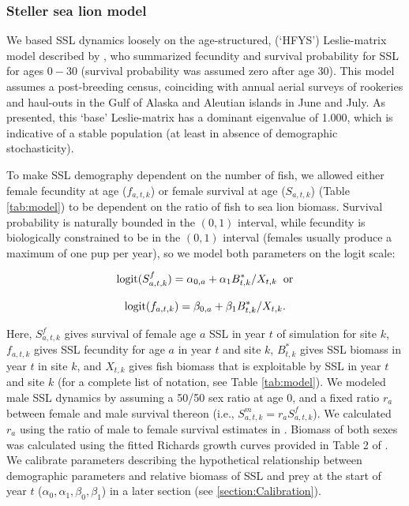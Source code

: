 \documentclass[nonumbib,leqno]{nrc1}
\begin{document}
\subsubsection{Steller sea lion model}

We based SSL dynamics loosely on the age-structured, (`HFYS') Leslie-matrix model described by \citet{HolmesEtAl2007}, who summarized fecundity and survival probability for SSL for ages $0-30$ (survival probability was assumed zero after age 30).  This model assumes a post-breeding census, coinciding with annual aerial surveys of rookeries and haul-outs in the Gulf of Alaska and Aleutian islands in June and July.  As presented, this `base' Leslie-matrix has a dominant eigenvalue of 1.000, which is indicative of a stable population (at least in absence of demographic stochasticity).

To make SSL demography dependent on the number of fish, we allowed either female fecundity at age ($f_{a,t,k}$) or female survival at age ($S_{a,t,k}$) (Table \ref{tab:model}) to be dependent on the ratio of fish to sea lion biomass.  Survival probability is naturally bounded in the $(0,1)$ interval, while
fecundity is biologically constrained to be in the $(0,1)$ interval (females usually produce a maximum of one pup per year), so we model both parameters on the logit scale:
\begin{linenomath}
\begin{equation*}
{\rm logit}(S^f_{a,t,k})=\alpha_{0,a} + \alpha_1 B_{t,k}^*/X_{t,k} \hspace{2mm} {\rm or}
\end{equation*}
\end{linenomath}
\begin{linenomath}
\begin{equation*}
{\rm logit}(f_{a,t,k})=\beta_{0,a} + \beta_1 B_{t,k}^*/X_{t,k}.
\end{equation*}
\end{linenomath}
Here, $S^f_{a,t,k}$ gives survival of female age $a$ SSL in year $t$ of simulation for site $k$, $f_{a,t,k}$ gives SSL fecundity for age $a$ in year $t$ and site $k$, $B_{t,k}^*$ gives SSL biomass in year $t$ in site $k$, and $X_{t,k}$ gives fish biomass that is exploitable by SSL in year $t$ and site $k$ (for a complete list of notation, see Table \ref{tab:model}).  We modeled male SSL dynamics by assuming a 50/50 sex ratio at age 0, and a fixed ratio $r_a$ between female and male survival thereon (i.e., $S^m_{a,t,k}=r_a S^f_{a,t,k}$).  We calculated $r_a$ using the ratio of male to female survival estimates in \citet{CalkinsPitcher1982}. Biomass of both sexes was calculated using the fitted Richards growth curves provided in Table 2 of \citet{WinshipEtAl2001}. We calibrate parameters describing the hypothetical relationship between demographic parameters and relative biomass of SSL and prey at the start of year $t$ ($\alpha_0,\alpha_1,\beta_0,\beta_1$) in a later section (see \ref{section:Calibration}).
\end{document}
